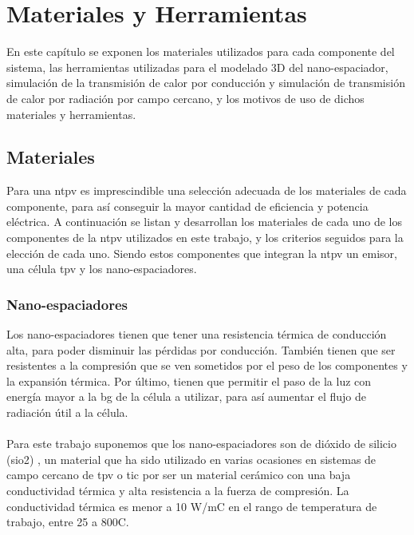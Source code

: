 \chapter{Materiales y Herramientas}
En este capítulo se exponen los materiales utilizados para cada componente del sistema, las herramientas utilizadas para el modelado 3D del nano-espaciador, simulación de la transmisión de calor por conducción y simulación de transmisión de calor por radiación por campo cercano, y los motivos de uso de dichos materiales y herramientas.
\section{Materiales}
Para una \acrshort{ntpv} es imprescindible una selección adecuada de los materiales de cada componente, para así conseguir la mayor cantidad de eficiencia y potencia eléctrica. A continuación se listan y desarrollan los materiales de cada uno de los componentes de la \acrshort{ntpv} utilizados en este trabajo, y los criterios seguidos para la elección de cada uno. Siendo estos componentes que integran la \acrshort{ntpv} un emisor, una célula \acrshort{tpv} y los nano-espaciadores.
\subsection{Nano-espaciadores}
Los nano-espaciadores tienen que tener una resistencia térmica de conducción alta, para poder disminuir las pérdidas por conducción. También tienen que ser resistentes a la compresión que se ven sometidos por el peso de los componentes y la expansión térmica. Por último, tienen que permitir el paso de la luz con energía mayor a la \acrshort{bg} de la célula a utilizar, para así aumentar el flujo de radiación útil a la célula.\\\\
Para este trabajo suponemos que los nano-espaciadores son de dióxido de silicio (\gls{sio2}) \cite{doi:10.1063/1.1141498}, un material que ha sido utilizado en varias ocasiones en sistemas de campo cercano de \acrshort{tpv} o \acrshort{tic} por ser un material cerámico con una baja conductividad térmica y alta resistencia a la fuerza de compresión. La conductividad térmica es menor a 10 W/m\textdegree C en el rango de temperatura de trabajo, entre 25 a 800\textdegree C.
